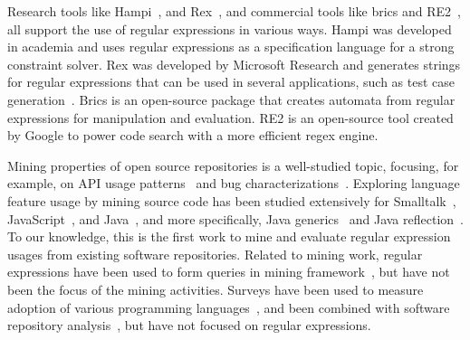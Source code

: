 Research tools like Hampi~\cite{hampi}, and Rex~\cite{rex}, and commercial tools like brics\cite{brics} and RE2~\cite{re2}, all support the use of regular expressions in various ways. Hampi was developed  in academia and uses regular expressions as a specification language for a strong constraint solver. Rex was developed by Microsoft Research and generates strings for regular expressions that can be used in several applications, such as test case generation~\cite{Anand:2013:OSM:2503903.2503991, Tillmann:2014:TAT:2642937.2642941}. Brics is an open-source package that creates automata from regular expressions for manipulation and evaluation.
RE2 is an open-source tool created by Google to power code search with a more efficient regex engine.


Mining properties of open source repositories is a well-studied topic, focusing, for example, on API usage patterns~\cite{Linares-Vasquez:2014:MEA:2597073.2597085} and bug characterizations~\cite{Chen:2014:ESD:2597073.2597108}.
Exploring language feature usage by mining source code has been studied extensively for
Smalltalk~\cite{Callau:2011:DUD:1985441.1985448, Callau:2013:DUD:2589712.2589718},
JavaScript~\cite{Richards:2010:ADB:1809028.1806598},
and Java~\cite{Dyer:2014:MBA:2568225.2568295, Grechanik:2010:EIL:1852786.1852801, Parnin:2013:AUJ:2589712.2589717, Livshits:2005:RAJ:2099708.2099724},
and more specifically,
Java generics~\cite{Parnin:2013:AUJ:2589712.2589717} and
Java reflection~\cite{Livshits:2005:RAJ:2099708.2099724}.
To our knowledge, this is the first work to mine and evaluate regular expression usages from existing software repositories. Related to mining work, regular expressions have been used to form queries in mining framework~\cite{Begel:2010:CDE:1806799.1806821}, but have not been the focus of the mining activities.
Surveys have been used to measure adoption of various programming languages~\cite{Meyerovich:2013:EAP:2509136.2509515, Dattero:2004:PLG:962081.962087}, and been combined with software repository analysis~\cite{Meyerovich:2013:EAP:2509136.2509515}, but have not focused on regular expressions.



